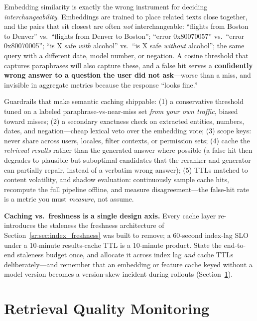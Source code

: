 \begin{warningbox}[title={\small Warning: The Semantic-Cache False Hit}]
Embedding similarity is exactly the wrong instrument for deciding \textit{interchangeability}. Embeddings are trained to place related texts close together, and the pairs that sit closest are often \textit{not} interchangeable: ``flights from Boston to Denver'' vs.\ ``flights from Denver to Boston''; ``error 0x80070057'' vs.\ ``error 0x80070005''; ``is X safe \textit{with} alcohol'' vs.\ ``is X safe \textit{without} alcohol''; the same query with a different date, model number, or negation. A cosine threshold that captures paraphrases will also capture these, and a false hit serves a \textbf{confidently wrong answer to a question the user did not ask}---worse than a miss, and invisible in aggregate metrics because the response ``looks fine.''

Guardrails that make semantic caching shippable: (1) a conservative threshold tuned on a labeled paraphrase-vs-near-miss set \textit{from your own traffic}, biased toward misses; (2) a secondary exactness check on extracted entities, numbers, dates, and negation---cheap lexical veto over the embedding vote; (3) scope keys: never share across users, locales, filter contexts, or permission sets; (4) cache the \textit{retrieval results} rather than the generated answer where possible (a false hit then degrades to plausible-but-suboptimal candidates that the reranker and generator can partially repair, instead of a verbatim wrong answer); (5) TTLs matched to content volatility, and shadow evaluation: continuously sample cache hits, recompute the full pipeline offline, and measure disagreement---the false-hit rate is a metric you must \textit{measure}, not assume.
\end{warningbox}

\textbf{Caching vs.\ freshness is a single design axis.} Every cache layer re-introduces the staleness the freshness architecture of Section~\ref{sr:sec:index_freshness} was built to remove; a 60-second index-lag SLO under a 10-minute results-cache TTL is a 10-minute product. State the end-to-end staleness budget once, and allocate it across index lag \textit{and} cache TTLs deliberately---and remember that an embedding or feature cache keyed without a model version becomes a version-skew incident during rollouts (Section~\ref{sr:sec:monitoring}).

\section{Retrieval Quality Monitoring}
\label{sr:sec:monitoring}

